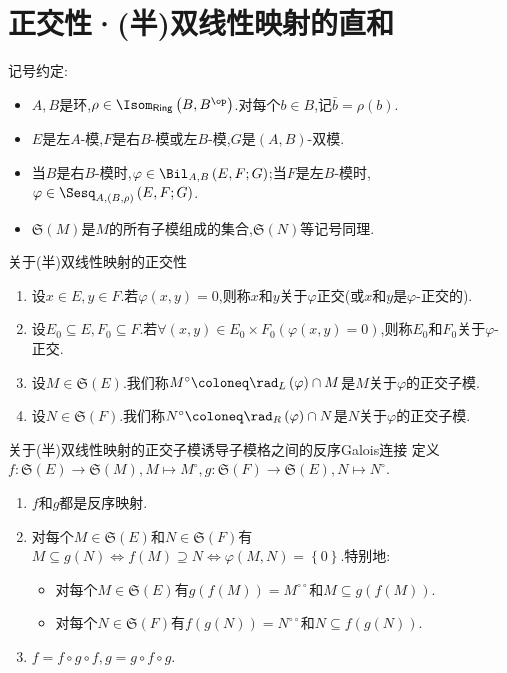 \section{正交性·(半)双线性映射的直和}

记号约定:
\begin{itemize}
	\item $A,B$是环,$\rho\in\Isom_{\mathsf{Ring}}\left(B,B^{\op}\right)$.对每个$b\in B$,记$\bar{b}=\rho\left(b\right)$.
	\item $E$是左$A$-模,$F$是右$B$-模或左$B$-模,$G$是$\left(A,B\right)$-双模.
	\item 当$B$是右$B$-模时,$\varphi\in\Bil_{A,B}\left(E,F;G\right)$;当$F$是左$B$-模时,$\varphi\in\Sesq_{A,(B,\rho)}\left(E,F;G\right)$.
	\item $\mathfrak{S}\left(M\right)$是$M$的所有子模组成的集合,$\mathfrak{S}\left(N\right)$等记号同理.
\end{itemize}

\begin{definition}{关于(半)双线性映射的正交性}{}
	\begin{enumerate}
		\item 设$x\in E,y\in F$.若$\varphi\left(x,y\right)=0$,则称$x$和$y$关于$\varphi$正交(或$x$和$y$是$\varphi$-正交的).
		\item 设$E_{0}\subseteq E,F_{0}\subseteq F$.若$\forall\left(x,y\right)\in E_{0}\times F_{0}\left(\varphi\left(x,y\right)=0\right)$,则称$E_{0}$和$F_{0}$关于$\varphi$-正交.
		\item 设$M\in\mathfrak{S}\left(E\right)$.我们称$M^{\circ}\coloneq\rad_{L}\left(\varphi\right)\cap M$是$M$关于$\varphi$的正交子模.
		\item 设$N\in\mathfrak{S}\left(F\right)$.我们称$N^{\circ}\coloneq\rad_{R}\left(\varphi\right)\cap N$是$N$关于$\varphi$的正交子模.
	\end{enumerate}
\end{definition}

\begin{proposition}{关于(半)双线性映射的正交子模诱导子模格之间的反序Galois连接}{}
	定义$f:\mathfrak{S}\left(E\right)\to\mathfrak{S}\left(M\right),M\mapsto M^{\circ},g:\mathfrak{S}\left(F\right)\to\mathfrak{S}\left(E\right),N\mapsto N^{\circ}$.
	\begin{enumerate}
		\item $f$和$g$都是反序映射.
		\item 对每个$M\in\mathfrak{S}\left(E\right)$和$N\in\mathfrak{S}\left(F\right)$有$M\subseteq g\left(N\right)\iff f\left(M\right)\supseteq N\iff\varphi\left(M,N\right)=\left\{0\right\}$.特别地:
		\begin{itemize}
			\item 对每个$M\in\mathfrak{S}\left(E\right)$有$g\left(f\left(M\right)\right)=M^{\circ\circ}$和$M\subseteq g\left(f\left(M\right)\right)$.
			\item 对每个$N\in\mathfrak{S}\left(F\right)$有$f\left(g\left(N\right)\right)=N^{\circ\circ}$和$N\subseteq f\left(g\left(N\right)\right)$.
		\end{itemize}
		\item $f=f\circ g\circ f,g=g\circ f\circ g$.
	\end{enumerate}
\end{proposition}

